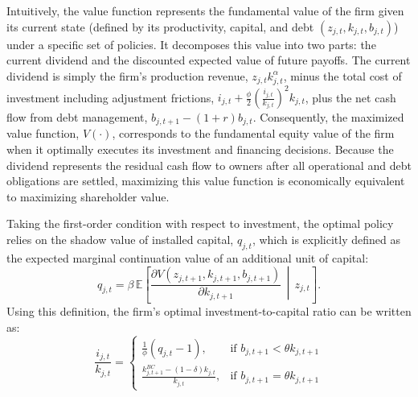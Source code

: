 Intuitively, the value function represents the fundamental value of the firm given its 
current state (defined by its productivity, capital, and debt $(z_{j,t}, k_{j,t}, b_{j,t})$) 
under a specific set of policies. It decomposes this value into two parts: the current 
dividend and the discounted expected value of future payoffs. The current dividend is 
simply the firm's production revenue, $z_{j,t} k_{j,t}^\alpha$, minus the total cost of 
investment including adjustment frictions, $i_{j,t} + \frac{\phi}{2} \left(\frac{i_{j,t}}{k_{j,t}}\right)^2 k_{j,t}$, 
plus the net cash flow from debt management, $b_{j,t+1} - (1+r)b_{j,t}$. Consequently, the 
maximized value function, $V(\cdot)$, corresponds to the fundamental equity value of 
the firm when it optimally executes its investment and financing decisions. Because the 
dividend represents the residual cash flow to owners after all operational and debt obligations are settled, maximizing this value function is 
economically equivalent to maximizing shareholder value.

Taking the first-order condition with respect to investment, the optimal policy relies 
on the shadow value of installed capital, $q_{j,t}$, which is explicitly defined as the 
expected marginal continuation value of an additional unit of capital:
\begin{equation}
    q_{j,t} = \beta \, \mathbb{E} \left[ \frac{\partial V(z_{j,t+1}, k_{j,t+1}, b_{j,t+1})}{\partial k_{j,t+1}} \,\middle|\, z_{j,t} \right].
\end{equation}
Using this definition, the firm's optimal investment-to-capital ratio can be written as:
\begin{equation}
\frac{i_{j,t}}{k_{j,t}} =
\begin{cases}
\frac{1}{\phi}(q_{j,t}-1),
& \text{if } b_{j,t+1} < \theta k_{j,t+1} \\[10pt]
\frac{k_{j,t+1}^{BC} - (1-\delta)k_{j,t}}{k_{j,t}},
& \text{if } b_{j,t+1} = \theta k_{j,t+1}
\end{cases}
\end{equation}

